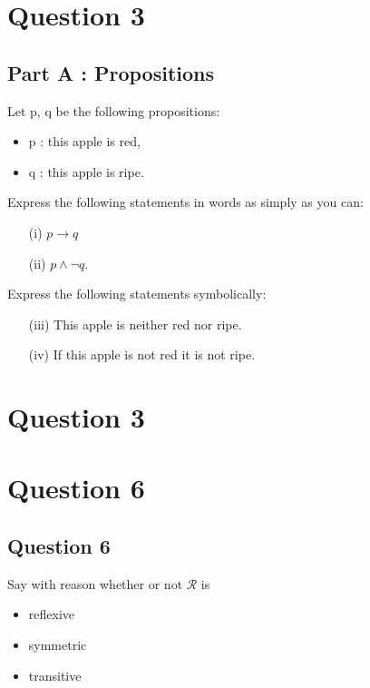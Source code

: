 \documentclass[]{report}
\begin{document}
\newpage



\section*{Question 3}
\subsection*{Part A : Propositions}
Let p, q be the following propositions:
\begin{itemize}
	\item p : this apple is red, 
	\item q : this apple is ripe.
\end{itemize}

\noindent Express the following statements in words as simply as you can:
\begin{itemize}
	\item[(i)] $p \rightarrow q$
	\item[(ii)] $p \wedge \neg q$.
\end{itemize}

\noindent Express the following statements symbolically:
\begin{itemize}
	\item[(iii)] This apple is neither red nor ripe.
	\item[(iv)] If this apple is not red it is not ripe.
\end{itemize}



\newpage
\section*{Question 3}





\section*{Question 6}

\subsection{Question 6}
Say with reason whether or not $\mathcal{R}$ is
\begin{itemize}
	\item reflexive
	\item symmetric
	\item transitive
\end{itemize}
\end{document}
